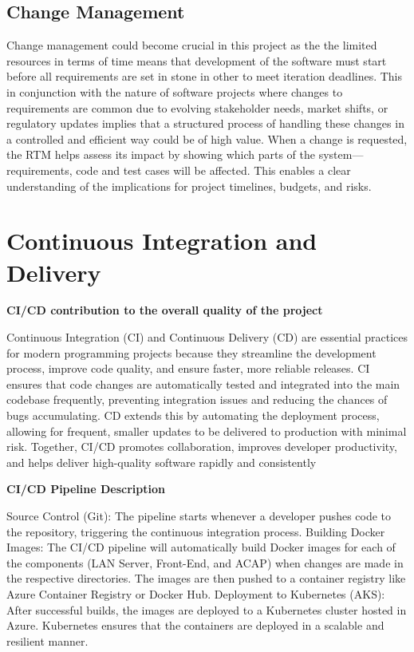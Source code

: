 \documentclass{article}
\begin{document}
\subsection{Change Management}
Change management could become crucial in this project as the the limited resources in terms of time means that development of the software must start before all requirements are set in stone in other to meet iteration deadlines. This in conjunction with the nature of software projects where changes to requirements are common due to evolving stakeholder needs, market shifts, or regulatory updates implies that a structured process of handling these changes in a controlled and efficient way could be of high value. When a change is requested, the RTM helps assess its impact by showing which parts of the system—requirements, code and test cases will be affected. This enables a clear understanding of the implications for project timelines, budgets, and risks.

\newpage
\section{Continuous Integration and Delivery}


\textbf{CI/CD contribution to the overall quality of the project}

Continuous Integration (CI) and Continuous Delivery (CD) are essential practices for modern programming projects because they streamline the development process, improve code quality, and ensure faster, more reliable releases. CI ensures that code changes are automatically tested and integrated into the main codebase frequently, preventing integration issues and reducing the chances of bugs accumulating. CD extends this by automating the deployment process, allowing for frequent, smaller updates to be delivered to production with minimal risk. Together, CI/CD promotes collaboration, improves developer productivity, and helps deliver high-quality software rapidly and consistently

\vspace{1em}
\textbf{CI/CD Pipeline Description}

Source Control (Git): The pipeline starts whenever a developer pushes code to the repository, triggering the continuous integration process.
Building Docker Images: The CI/CD pipeline will automatically build Docker images for each of the components (LAN Server, Front-End, and ACAP) when changes are made in the respective directories. The images are then pushed to a container registry like Azure Container Registry or Docker Hub.
Deployment to Kubernetes (AKS): After successful builds, the images are deployed to a Kubernetes cluster hosted in Azure. Kubernetes ensures that the containers are deployed in a scalable and resilient manner.
\vspace{1em}
\end{document}
